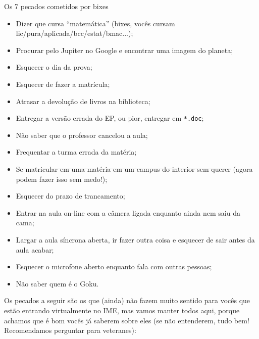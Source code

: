 \begin{editorial}{Os 7 pecados cometidos por bixes}

\begin{itemize}
  \item Dizer que cursa ``matemática'' (bixes, vocês cursam
        lic/pura/aplicada/bcc/estat/bmac...);
  \item Procurar pelo Jupiter no Google e encontrar uma imagem do planeta;
  \item Esquecer o dia da prova;
  \item Esquecer de fazer a matrícula;
  \item Atrasar a devolução de livros na biblioteca;
  \item Entregar a versão errada do EP, ou pior, entregar em \texttt{*.doc};
  \item Não saber que o professor cancelou a aula;
  \item Frequentar a turma errada da matéria;
  \item \sout{Se matricular em uma matéria em um campus do interior sem querer}
        (agora podem fazer isso sem medo!);
  \item Esquecer do prazo de trancamento;
  \item Entrar na aula on-line com a câmera ligada enquanto ainda nem saiu da cama;
  \item Largar a aula síncrona aberta, ir fazer outra coisa e esquecer de sair antes da aula acabar;
  \item Esquecer o microfone aberto enquanto fala com outras pessoas;
  \item Não saber quem é o Goku.
\end{itemize}

Os pecados a seguir são os que (ainda) não fazem muito sentido para vocês que
estão entrando virtualmente no IME, mas vamos manter todos aqui, porque
achamos que é bom vocês já saberem sobre eles (se não entenderem,
tudo bem! Recomendamos perguntar para veteranes):


\end{editorial}
